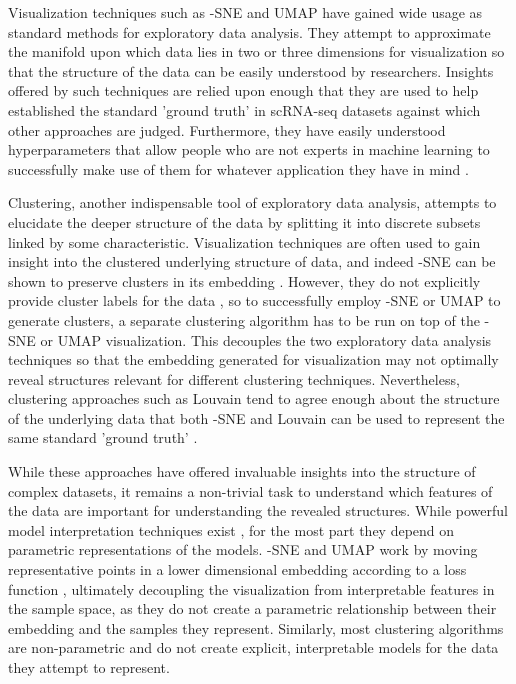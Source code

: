 \documentclass{article}
\begin{document}
Visualization techniques such as -SNE \cite{maaten2008visualizing} and UMAP \cite{2018arXivUMAP} have gained wide usage as standard methods for exploratory data analysis. They attempt to approximate the manifold upon which data lies in two or three dimensions for visualization so that the structure of the data can be easily understood by researchers. Insights offered by such techniques are relied upon enough that they are used to help established the standard 'ground truth' in scRNA-seq datasets \cite{shekhar2016comprehensive} against which other approaches are judged. Furthermore, they have easily understood hyperparameters that allow people who are not experts in machine learning to successfully make use of them for whatever application they have in mind \cite{2018arXivUMAP, maaten2008visualizing}.

Clustering, another indispensable tool of exploratory data analysis, attempts to elucidate the deeper structure of the data by splitting it into discrete subsets linked by some characteristic. Visualization techniques are often used to gain insight into the clustered underlying structure of data, and indeed -SNE can be shown to preserve clusters in its embedding \cite{linderman2019clustering}. However, they do not explicitly provide cluster labels for the data \cite{2018arXivUMAP, maaten2008visualizing}, so to successfully employ -SNE or UMAP to generate clusters, a separate clustering algorithm has to be run on top of the -SNE or UMAP visualization. This decouples the two exploratory data analysis techniques so that the embedding generated for visualization may not optimally reveal structures relevant for different clustering techniques. Nevertheless, clustering approaches such as Louvain tend to agree enough about the structure of the underlying data that both -SNE and Louvain \cite{blondel2008fast} can be used to represent the same standard 'ground truth' \cite{shekhar2016comprehensive}.

While these approaches have offered invaluable insights into the structure of complex datasets, it remains a non-trivial task to understand which features of the data are important for understanding the revealed structures. While powerful model interpretation techniques exist \cite{ribeiro2016modelagnostic, NIPS2017_7062}, for the most part they depend on parametric representations of the models. -SNE and UMAP work by moving representative points in a lower dimensional embedding according to a loss function \cite{2018arXivUMAP, maaten2008visualizing}, ultimately decoupling the visualization from interpretable features in the sample space, as they do not create a parametric relationship between their embedding and the samples they represent. Similarly, most clustering algorithms are non-parametric and do not create explicit, interpretable models for the data they attempt to represent. 
\end{document}
